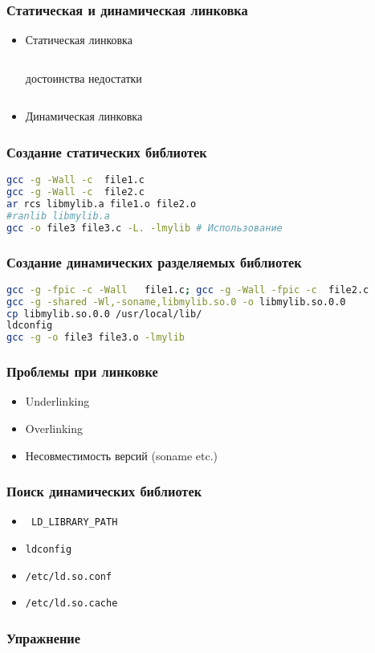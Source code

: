 \begin{frame}
 \frametitle{Статическая и динамическая линковка}
 \begin{itemize}
   \item Статическая линковка
     \begin{columns}
       достоинства недостатки
     \end{columns}
   \item Динамическая линковка
 \end{itemize}
\end{frame}
\begin{frame}
 \frametitle{Создание статических библиотек}
\begin{lstlisting}[language=sh]
gcc -g -Wall -c  file1.c
gcc -g -Wall -c  file2.c
ar rcs libmylib.a file1.o file2.o
#ranlib libmylib.a
gcc -o file3 file3.c -L. -lmylib # Использование
\end{lstlisting}
\end{frame}

\begin{frame}
  \frametitle{Создание динамических разделяемых библиотек}
\begin{lstlisting}[language=sh]
gcc -g -fpic -c -Wall   file1.c; gcc -g -Wall -fpic -c  file2.c
gcc -g -shared -Wl,-soname,libmylib.so.0 -o libmylib.so.0.0 
cp libmylib.so.0.0 /usr/local/lib/
ldconfig 
gcc -g -o file3 file3.o -lmylib
\end{lstlisting}
\end{frame}

\begin{frame}
 \frametitle{Проблемы при линковке}
 \begin{itemize}
   \item Underlinking
   \item Overlinking
   \item Несовместимость версий (soname etc.)
 \end{itemize}
\end{frame}

\begin{frame}
  \frametitle{Поиск динамических библиотек}
  \begin{itemize}
    \item \verb+ LD_LIBRARY_PATH +
    \item {\tt ldconfig}
    \item {\tt /etc/ld.so.conf}
    \item {\tt /etc/ld.so.cache}
  \end{itemize}
\end{frame}

\begin{frame}
  \frametitle{Упражнение}
\end{frame}
